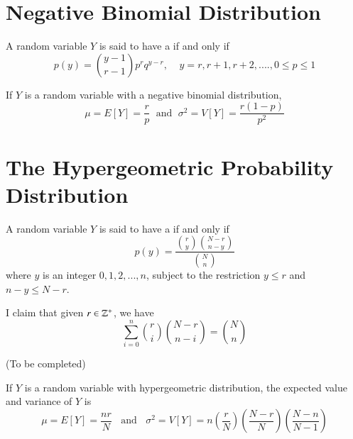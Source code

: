 \documentclass[12pt, a4paper, twoside, openright, titlepage]{book}
\begin{document}
\section{\textsection Negative Binomial Distribution}

\begin{defn}{}{}
    A random variable $Y$ is said to have a  if and only if \begin{equation*}
        p(y) = \binom{y-1}{r-1}p^rq^{y-r},\;\;\;\; y = r,r+1,r+2,...., 0\leq p \leq 1
    \end{equation*}
\end{defn}


\begin{thm}{}{}
    If $Y$ is a random variable with a negative binomial distribution, \begin{equation*}
        \mu = E[Y] = \frac{r}{p} \;\text{ and }\; \sigma^2 = V[Y] = \frac{r(1-p)}{p^2}
    \end{equation*}
\end{thm}



\section{\textsection The Hypergeometric Probability Distribution}

\begin{defn}{}{}
    A random variable $Y$ is said to have a  if and only if \begin{equation*}
        p(y) = \frac{\binom{r}{y}\binom{N-r}{n-y}}{\binom{N}{n}}
    \end{equation*}
    where $y$ is an integer $0,1,2,...,n$, subject to the restriction $y \leq r$ and $n-y \leq N-r$.
\end{defn}


\begin{claim}{}{}
    I claim that given $r \in \mathbb Z^+$, we have \begin{equation*}
        \sum\limits_{i=0}^{n}\binom{r}{i}\binom{N-r}{n-i} = \binom{N}{n}
    \end{equation*}
\end{claim}
\begin{proof*}{}{}
    (To be completed)
\end{proof*}


\begin{thm}{}{}
    If $Y$ is a random variable with hypergeometric distribution, the expected value and variance of $Y$ is \begin{equation*}
        \mu = E[Y] = \frac{nr}{N}\;\;\text{ and }\;\;\sigma^2 = V[Y] = n\left(\frac{r}{N}\right)\left(\frac{N-r}{N}\right)\left(\frac{N-n}{N-1}\right)
    \end{equation*}
\end{thm}
\end{document}

